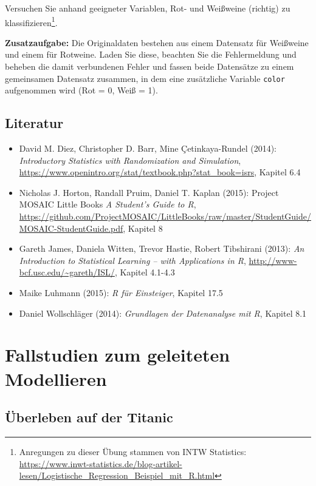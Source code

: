\documentclass[12pt,ngerman,]{book}
\providecommand{\tightlist}{%
  \setlength{\itemsep}{0pt}\setlength{\parskip}{0pt}}
\let\rmarkdownfootnote\footnote%
\def\footnote{\protect\rmarkdownfootnote}
\begin{document}
Versuchen Sie anhand geeigneter Variablen, Rot- und Weißweine (richtig)
zu klassifizieren\footnote{Anregungen zu dieser Übung stammen von INTW
  Statistics:
  \url{https://www.inwt-statistics.de/blog-artikel-lesen/Logistische_Regression_Beispiel_mit_R.html}}.

\textbf{Zusatzaufgabe:} Die Originaldaten bestehen aus einem Datensatz
für Weißweine und einem für Rotweine. Laden Sie diese, beachten Sie die
Fehlermeldung und beheben die damit verbundenen Fehler und fassen beide
Datensätze zu einem gemeinsamen Datensatz zusammen, in dem eine
zusätzliche Variable \texttt{color} aufgenommen wird (Rot = 0, Weiß =
1).

\section{Literatur}\label{literatur-2}

\begin{itemize}
\tightlist
\item
  David M. Diez, Christopher D. Barr, Mine Çetinkaya-Rundel (2014):
  \emph{Introductory Statistics with Randomization and Simulation},
  \url{https://www.openintro.org/stat/textbook.php?stat_book=isrs},
  Kapitel 6.4
\item
  Nicholas J. Horton, Randall Pruim, Daniel T. Kaplan (2015): Project
  MOSAIC Little Books \emph{A Student's Guide to R},
  \url{https://github.com/ProjectMOSAIC/LittleBooks/raw/master/StudentGuide/MOSAIC-StudentGuide.pdf},
  Kapitel 8
\item
  Gareth James, Daniela Witten, Trevor Hastie, Robert Tibshirani (2013):
  \emph{An Introduction to Statistical Learning -- with Applications in
  R}, \url{http://www-bcf.usc.edu/~gareth/ISL/}, Kapitel 4.1-4.3
\item
  Maike Luhmann (2015): \emph{R für Einsteiger}, Kapitel 17.5
\item
  Daniel Wollschläger (2014): \emph{Grundlagen der Datenanalyse mit R},
  Kapitel 8.1
\end{itemize}

\chapter{Fallstudien zum geleiteten
Modellieren}\label{fallstudien-zum-geleiteten-modellieren}

\section{Überleben auf der Titanic}\label{uberleben-auf-der-titanic}
\end{document}
